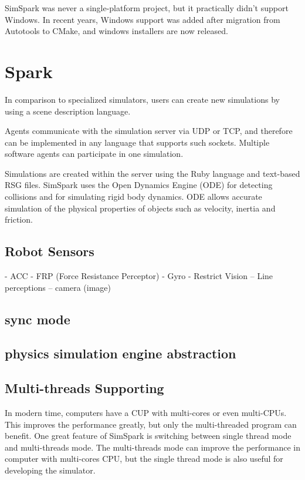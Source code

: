 \documentclass{llncs}
\begin{document}
SimSpark was never a single-platform project, but it practically didn't support 
Windows. In recent years, Windows support was added after migration from Autotools
to CMake, and windows installers are now released. 

\section{Spark}
\label{s:spark}

In comparison to specialized simulators, users can create new simulations by using a scene description language.

Agents communicate with the simulation server via UDP or TCP, and therefore can be implemented in any language that supports such sockets.
Multiple software agents can participate in one simulation.

Simulations are created within the server using the Ruby language and text-based RSG files.
SimSpark uses the Open Dynamics Engine (ODE) for detecting collisions and for simulating rigid body dynamics. ODE allows accurate simulation of the physical properties of objects such as velocity, inertia and friction.



\subsection{Robot Sensors}
 - ACC
 - FRP (Force Resistance Perceptor)
 - Gyro
 - Restrict Vision
 -- Line perceptions
 -- camera (image)

\subsection{sync mode}

\subsection{physics simulation engine abstraction}

\subsection{Multi-threads Supporting}
In modern time, computers have a CUP with multi-cores or even multi-CPUs.
This improves the performance greatly, but only the multi-threaded program can benefit.
One great feature of SimSpark is switching between single thread mode and multi-threads
mode. The multi-threads mode can improve the performance in computer with multi-cores CPU, but the single thread mode is also useful for developing the simulator. 
\end{document}
